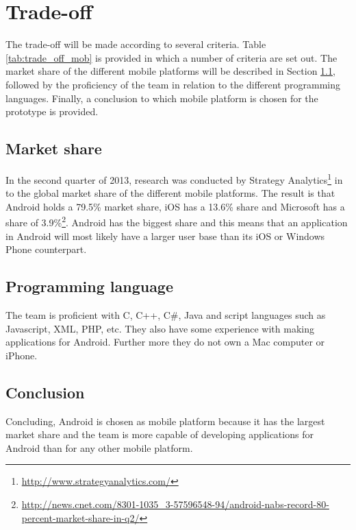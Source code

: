 \section{Trade-off}
\label{sec:trade_off_mobplat}
The trade-off will be made according to several criteria. Table \ref{tab:trade_off_mob} is provided in which a number of criteria are set out. The market share of the different mobile platforms will be described in Section \ref{sec:mark_share}, followed by the proficiency of the team in relation to the different programming languages. Finally, a conclusion to which mobile platform is chosen for the prototype is provided.

\subsection{Market share}
\label{sec:mark_share}
In the second quarter of 2013, research was conducted by Strategy Analytics\footnote{\url{http://www.strategyanalytics.com/}} in to the global market share of the different mobile platforms. The result is that Android holds a 79.5\% market share, iOS has a 13.6\% share and Microsoft has a share of 3.9\%\footnote{\url{http://news.cnet.com/8301-1035\_3-57596548-94/android-nabs-record-80-percent-market-share-in-q2/}}.  Android has the biggest share and this means that an application in Android will most likely have a larger user base than its iOS or Windows Phone counterpart.

\subsection{Programming language}
The team is proficient with C, C++, C\#, Java and script languages such as Javascript, XML, PHP, etc. They also have some experience with making applications for Android. Further more they do not own a Mac computer or iPhone. 

\subsection{Conclusion}
Concluding, Android is chosen as mobile platform because it has the largest market share and the team is more capable of developing applications for Android than for any other mobile platform.

